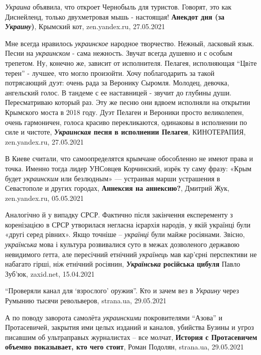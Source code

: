 \emph{Украина} объявила, что откроет Чернобыль для туристов. Говорят, это как
Диснейленд, только двухметровая мышь - настоящая!  \textbf{Анекдот дня (за
\emph{Украину})}, Крымский кот, zen.yandex.ru, 27.05.2021

Мне всегда нравилось \emph{украинское} народное творчество. Нежный, ласковый
язык.  Песни на \emph{украинском} - сама нежность. Звучат всегда душевно и с
особым трепетом.  Ну, конечно же, зависит от исполнителя.  Пелагея, исполняющая
\enquote{Цвiте терен} - лучшее, что могло произойти.  Хочу поблагодарить за
такой потрясающий дуэт: очень рада за Веронику Сыромля. Молодец, девочка,
ангельский голос. В тандеме с ее наставницей - звучит до глубины души.
Пересматриваю который раз.  Эту же песню они вдвоем исполняли на открытии
Крымского моста в 2018 году. Дуэт Пелагеи и Вероники просто великолепен, очень
гармоничен, голоса красиво перекликаются, одинаковы в исполнении по силе и
чистоте, \textbf{\emph{Украинская} песня в исполнении Пелагеи}, КИНОТЕРАПИЯ,
zen.yandex.ru, 27.05.2021

В Киеве считали, что самоопределятся крымчане обособленно не имеют права и
точка. Именно тогда лидер УНСовцев Корчинский, изрёк ту саму фразу: «Крым будет
\emph{украинским} или безлюдным» — устраивая марши устрашения в Севастополе и
других городах, \textbf{Аннексия на аннексию?}, Дмитрий Жук, zen.yandex.ru,
05.05.2021

Аналогічно й у випадку СРСР. Фактично після закінчення експеременту з
коренізацією в СРСР утворилася негласна ієрархія народів, у якій українці були
«другі серед рівних». Якщо точніше – \emph{українці} були майже росіянами. Звісно,
\emph{українська} мова і культура розвивалися суто в межах дозволеного державою
невидимого ґетта, але пересічний етнічний \emph{українець} мав кар'єрні перспективи не
набагато гірші, ніж етнічний росіянин, 
\textbf{\emph{Українська} російська цибуля} Павло Зуб'юк, zaxid.net, 15.04.2021

\enquote{Проверяли канал для \enquote{взрослого} оружия}. Кто и зачем вез в
\emph{Украину} через Румынию тысячи револьверов, strana.ua, 29.05.2021

А по поводу заворота самолёта \emph{украинскими} покровителями \enquote{Азова} и Протасевичей,
закрытия ими целых изданий и каналов, убийства Бузины и угроз писавшим об
ультраправых журналистах -- все молчат, \textbf{История с Протасевичем объемно показывает, кто чего стоит}, Роман Подолян, strana.ua, 29.05.2021
